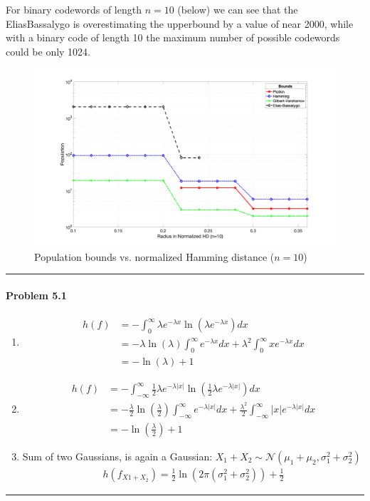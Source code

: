 \documentclass[12pt, letterpaper]{scrartcl}
\begin{document}
For binary codewords of length $n=10$ (below) we can see that the EliasBassalygo is overestimating the upperbound by a value of near 2000, while with a binary code of length 10 the maximum number of possible codewords could be only 1024.
\begin{figure}[H]
    \includegraphics[width=\linewidth]{hw5_figures/10.png}
    \centering
    \caption{Population bounds vs. normalized Hamming distance ($n=10$)}
\end{figure}
\hrule

\paragraph*{Problem 5.1} \hfill\newline
\begin{enumerate}[((a))]
    \item
    \begin{align*}
        h(f)&=-\int_0^\infty\lambda e^{-\lambda x}\ln(\lambda e^{-\lambda x})dx\\
        &=-\lambda\ln(\lambda)\int_0^\infty e^{-\lambda x}dx + \lambda^2\int_0^\infty xe^{-\lambda x} dx\\
        &=-\ln(\lambda)+1
    \end{align*}
    \item
    \begin{align*}
        h(f)&=-\int_{-\infty}^\infty\frac{1}{2}\lambda e^{-\lambda |x|}\ln(\frac{1}{2}\lambda e^{-\lambda |x|})dx\\
        &=-\frac{\lambda}{2}\ln(\frac{\lambda}{2})\int_{-\infty}^\infty e^{-\lambda |x|}dx + \frac{\lambda^2}{2}\int_{-\infty}^\infty |x|e^{-\lambda |x|} dx\\
        &=-\ln(\frac{\lambda}{2})+1
    \end{align*}
    \item Sum of two Gaussians, is again a Gaussian: $X_1+X_2\sim\mathcal{N}(\mu_1+\mu_2, \sigma_1^2+\sigma_2^2)$
    \begin{align*}
        h(f_{X1+X_2})=\frac{1}{2}\ln(2\pi(\sigma_1^2+\sigma_2^2))+\frac{1}{2}
    \end{align*}
\end{enumerate}
\hrule
\end{document}
